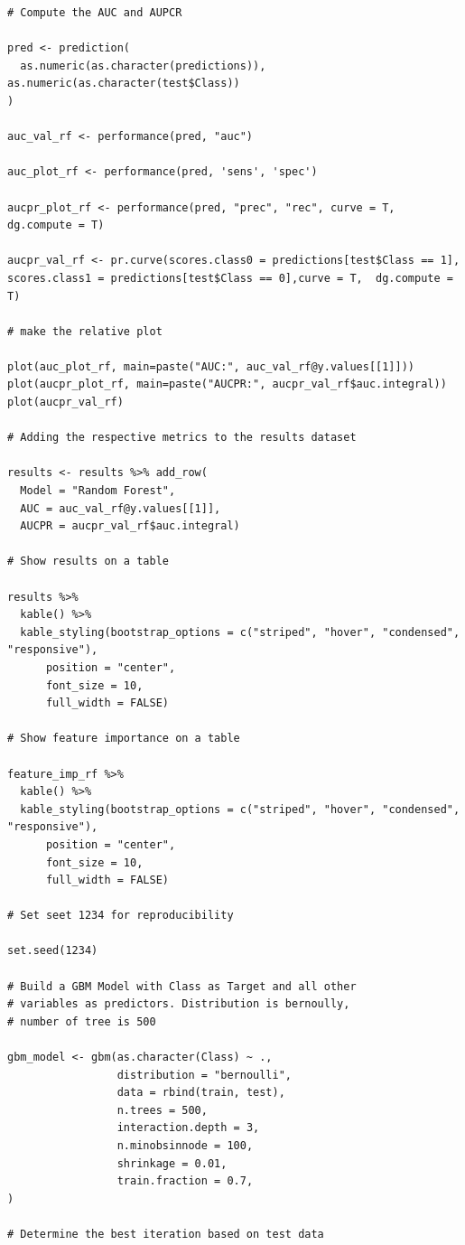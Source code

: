 \documentclass[]{article}
\begin{document}
\begin{verbatim}
# Compute the AUC and AUPCR

pred <- prediction(
  as.numeric(as.character(predictions)),                                 as.numeric(as.character(test$Class))
)

auc_val_rf <- performance(pred, "auc")

auc_plot_rf <- performance(pred, 'sens', 'spec')

aucpr_plot_rf <- performance(pred, "prec", "rec", curve = T,  dg.compute = T)

aucpr_val_rf <- pr.curve(scores.class0 = predictions[test$Class == 1], scores.class1 = predictions[test$Class == 0],curve = T,  dg.compute = T)

# make the relative plot

plot(auc_plot_rf, main=paste("AUC:", auc_val_rf@y.values[[1]]))
plot(aucpr_plot_rf, main=paste("AUCPR:", aucpr_val_rf$auc.integral))
plot(aucpr_val_rf)

# Adding the respective metrics to the results dataset

results <- results %>% add_row(
  Model = "Random Forest",
  AUC = auc_val_rf@y.values[[1]],
  AUCPR = aucpr_val_rf$auc.integral)

# Show results on a table

results %>%
  kable() %>%
  kable_styling(bootstrap_options = c("striped", "hover", "condensed",           "responsive"),
      position = "center",
      font_size = 10,
      full_width = FALSE)

# Show feature importance on a table

feature_imp_rf %>%
  kable() %>%
  kable_styling(bootstrap_options = c("striped", "hover", "condensed",           "responsive"),
      position = "center",
      font_size = 10,
      full_width = FALSE)
 
# Set seet 1234 for reproducibility

set.seed(1234)

# Build a GBM Model with Class as Target and all other
# variables as predictors. Distribution is bernoully, 
# number of tree is 500

gbm_model <- gbm(as.character(Class) ~ .,
                 distribution = "bernoulli", 
                 data = rbind(train, test), 
                 n.trees = 500,
                 interaction.depth = 3, 
                 n.minobsinnode = 100, 
                 shrinkage = 0.01, 
                 train.fraction = 0.7,
)

# Determine the best iteration based on test data


\end{verbatim}
\end{document}
